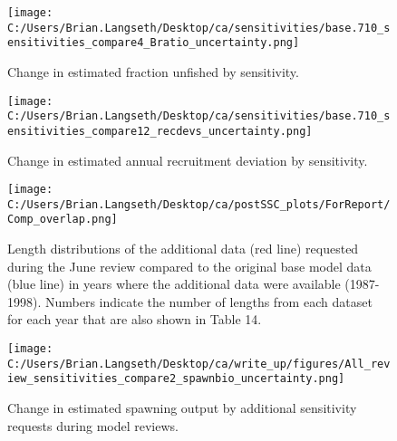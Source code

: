 \documentclass[11pt,
  english,
  letterpaper,
]{article}
\begin{document}
\tagmcend\tagstructend


\begin{figure}
\centering
\texttt{[image: C:/Users/Brian.Langseth/Desktop/ca/sensitivities/base.710\_sensitivities\_compare4\_Bratio\_uncertainty.png]}
\caption{Change in estimated fraction unfished by sensitivity.\label{fig:sens-depl}}
\end{figure}

\tagmcend\tagstructend


\begin{figure}
\centering
\texttt{[image: C:/Users/Brian.Langseth/Desktop/ca/sensitivities/base.710\_sensitivities\_compare12\_recdevs\_uncertainty.png]}
\caption{Change in estimated annual recruitment deviation by sensitivity.\label{fig:sens-recdev}}
\end{figure}

\tagmcend\tagstructend


\begin{figure}
\centering
\texttt{[image: C:/Users/Brian.Langseth/Desktop/ca/postSSC\_plots/ForReport/Comp\_overlap.png]}
\caption{Length distributions of the additional data (red line) requested during the June review compared to the original base model data (blue line) in years where the additional data were available (1987-1998). Numbers indicate the number of lengths from each dataset for each year that are also shown in Table 14.\label{fig:sens-debWV-comp}}
\end{figure}

\tagmcend\tagstructend


\begin{figure}
\centering
\texttt{[image: C:/Users/Brian.Langseth/Desktop/ca/write\_up/figures/All\_review\_sensitivities\_compare2\_spawnbio\_uncertainty.png]}
\caption{Change in estimated spawning output by additional sensitivity requests during model reviews.\label{fig:review-sens-ssb}}
\end{figure}
\end{document}
